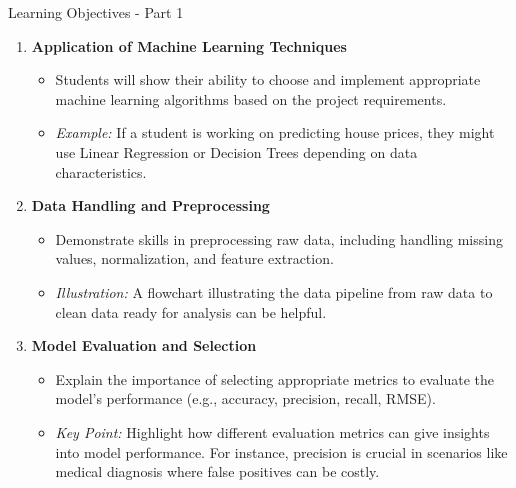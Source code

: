 \documentclass[aspectratio=169]{beamer}
\begin{document}
\begin{frame}[fragile]{Learning Objectives - Part 1}
    \begin{enumerate}
        \item \textbf{Application of Machine Learning Techniques}
        \begin{itemize}
            \item Students will show their ability to choose and implement appropriate machine learning algorithms based on the project requirements.
            \item \textit{Example:} If a student is working on predicting house prices, they might use Linear Regression or Decision Trees depending on data characteristics.
        \end{itemize}

        \item \textbf{Data Handling and Preprocessing}
        \begin{itemize}
            \item Demonstrate skills in preprocessing raw data, including handling missing values, normalization, and feature extraction.
            \item \textit{Illustration:} A flowchart illustrating the data pipeline from raw data to clean data ready for analysis can be helpful.
        \end{itemize}

        \item \textbf{Model Evaluation and Selection}
        \begin{itemize}
            \item Explain the importance of selecting appropriate metrics to evaluate the model's performance (e.g., accuracy, precision, recall, RMSE).
            \item \textit{Key Point:} Highlight how different evaluation metrics can give insights into model performance. For instance, precision is crucial in scenarios like medical diagnosis where false positives can be costly.
        \end{itemize}
    \end{enumerate}
\end{frame}
\end{document}
